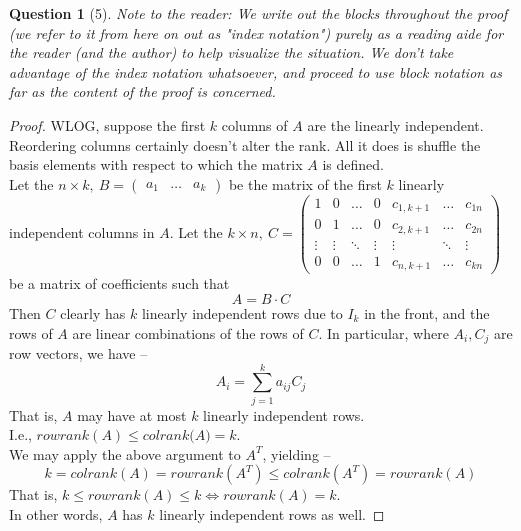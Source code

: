 \documentclass[11pt]{article}
\theoremstyle{quest}
\newtheorem*{question}{Question}
\begin{document}
\begin{question}[5]
Note to the reader: We write out the blocks throughout the proof (we refer to it from here on out as "index notation") purely as a reading aide for the reader (and the author) to help visualize the situation. We don't take advantage of the index notation whatsoever, and proceed to use block notation as far as the content of the proof is concerned.
\end{question}
\begin{proof}
WLOG, suppose the first $k$ columns of $A$ are the linearly independent. Reordering columns certainly doesn't alter the rank. All it does is shuffle the basis elements with respect to which the matrix $A$ is defined.
\\Let the $n \times k,\ B = \begin{pmatrix}
a_1 & \ldots & a_k
\end{pmatrix}$ be the matrix of the first $k$ linearly independent columns in $A$. Let the $k \times n,\ C = \begin{pmatrix}
1 & 0 & \ldots & 0 & c_{1,k+1} & \ldots & c_{1n} \\
0 & 1 & \ldots & 0 & c_{2,k+1} & \ldots & c_{2n} \\
\vdots & \vdots & \ddots & \vdots & \vdots & \ddots & \vdots \\
0 & 0 & \ldots & 1 & c_{n,k+1} & \ldots & c_{kn}
\end{pmatrix} $ be a matrix of coefficients such that
$$A = B \cdot C$$
Then $C$ clearly has $k$ linearly independent rows due to $I_k$ in the front, and the rows of $A$ are linear combinations of the rows of $C$. In particular, where $A_i, C_j$ are row vectors, we have --
$$A_i = \sum_{j=1}^k a_{ij} C_j$$
That is, $A$ may have at most $k$ linearly independent rows.
\\I.e., $\textit{rowrank}(A) \le \textit{colrank(A)} = k$.
\\We may apply the above argument to $A^T$, yielding --
$$k=\textit{colrank}(A) = \textit{rowrank}(A^T) \le \textit{colrank}(A^T) = \textit{rowrank}(A)$$
That is, $k \le \textit{rowrank}(A) \le k \iff \textit{rowrank}(A) = k$.
\\In other words, $A$ has $k$ linearly independent rows as well.
\end{proof}
\end{document}
